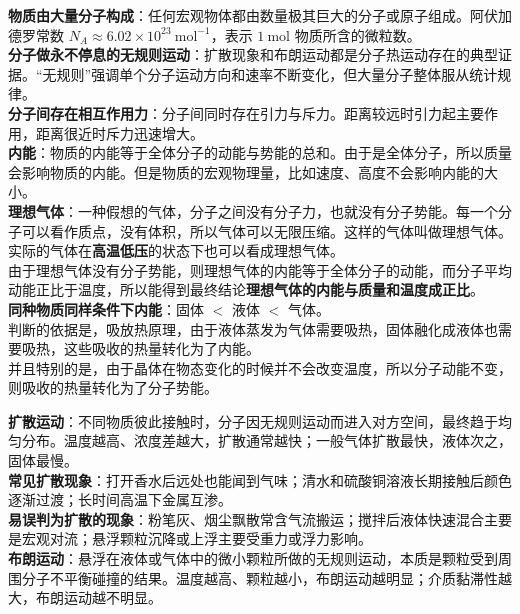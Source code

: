 \begin{keypointbox}[title={\strut\textcolor{white}{\bfseries 重点知识点：分子动理论}}]
\textbf{物质由大量分子构成}：任何宏观物体都由数量极其巨大的分子或原子组成。阿伏加德罗常数
$N_A\approx 6.02\times 10^{23}\ \mathrm{mol^{-1}}$，表示 $1\ \mathrm{mol}$ 物质所含的微粒数。\\

\textbf{分子做永不停息的无规则运动}：扩散现象和布朗运动都是分子热运动存在的典型证据。“无规则”强调单个分子运动方向和速率不断变化，但大量分子整体服从统计规律。\\

\textbf{分子间存在相互作用力}：分子间同时存在引力与斥力。距离较远时引力起主要作用，距离很近时斥力迅速增大。\\
\textbf{内能}：物质的内能等于全体分子的动能与势能的总和。由于是全体分子，所以质量会影响物质的内能。但是物质的宏观物理量，比如速度、高度不会影响内能的大小。\\
\textbf{理想气体}：一种假想的气体，分子之间没有分子力，也就没有分子势能。每一个分子可以看作质点，没有体积，所以气体可以无限压缩。这样的气体叫做理想气体。\\
实际的气体在\textbf{高温低压}的状态下也可以看成理想气体。\\
由于理想气体没有分子势能，则理想气体的内能等于全体分子的动能，而分子平均动能正比于温度，所以能得到最终结论\textbf{理想气体的内能与质量和温度成正比}。\\
\textbf{同种物质同样条件下内能}：固体 $<$ 液体 $<$ 气体。\\
判断的依据是，吸放热原理，由于液体蒸发为气体需要吸热，固体融化成液体也需要吸热，这些吸收的热量转化为了内能。\\
并且特别的是，由于晶体在物态变化的时候并不会改变温度，所以分子动能不变，则吸收的热量转化为了分子势能。
\end{keypointbox}

\begin{keypointbox}[title={\strut\textcolor{white}{\bfseries 重点知识点：扩散与布朗运动}}]
\textbf{扩散运动}：不同物质彼此接触时，分子因无规则运动而进入对方空间，最终趋于均匀分布。温度越高、浓度差越大，扩散通常越快；一般气体扩散最快，液体次之，固体最慢。\\

\textbf{常见扩散现象}：打开香水后远处也能闻到气味；清水和硫酸铜溶液长期接触后颜色逐渐过渡；长时间高温下金属互渗。\\

\textbf{易误判为扩散的现象}：粉笔灰、烟尘飘散常含气流搬运；搅拌后液体快速混合主要是宏观对流；悬浮颗粒沉降或上浮主要受重力或浮力影响。\\

\textbf{布朗运动}：悬浮在液体或气体中的微小颗粒所做的无规则运动，本质是颗粒受到周围分子不平衡碰撞的结果。温度越高、颗粒越小，布朗运动越明显；介质黏滞性越大，布朗运动越不明显。\\
\end{keypointbox}

